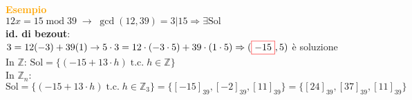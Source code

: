 \begin{flushleft}
    \begin{boxA}
        \textcolor{orange}{\textbf{Esempio}} \\
        $12x = 15 \; \text{mod} \; 39 \; \rightarrow \; \gcd (12, 39) = 3|15 \Rightarrow \exists \text{Sol}$ \\
        \textbf{id. di bezout}: $3 = 12 (-3) + 39 (1) \rightarrow 5 \cdot 3 = 12 \cdot (-3 \cdot 5) + 39 \cdot (1 \cdot 5) \Rightarrow (\fcolorbox{red}{white}{$-15$}, 5)$ è soluzione \\
        In $\mathbb{Z}$: $\text{Sol} = \{(-15 + 13 \cdot h) \; \text{t.c.} \; h \in \mathbb{Z}\}$ \\
        In $\mathbb{Z}_n$: $\text{Sol} = \{(-15 + 13 \cdot h) \; \text{t.c.} \; h \in \mathbb{Z}_3\} = \{[-15]_{39}, [-2]_{39}, [11]_{39}\} = \{[24]_{39}, [37]_{39}, [11]_{39}\}$
    \end{boxA}
\end{flushleft}


